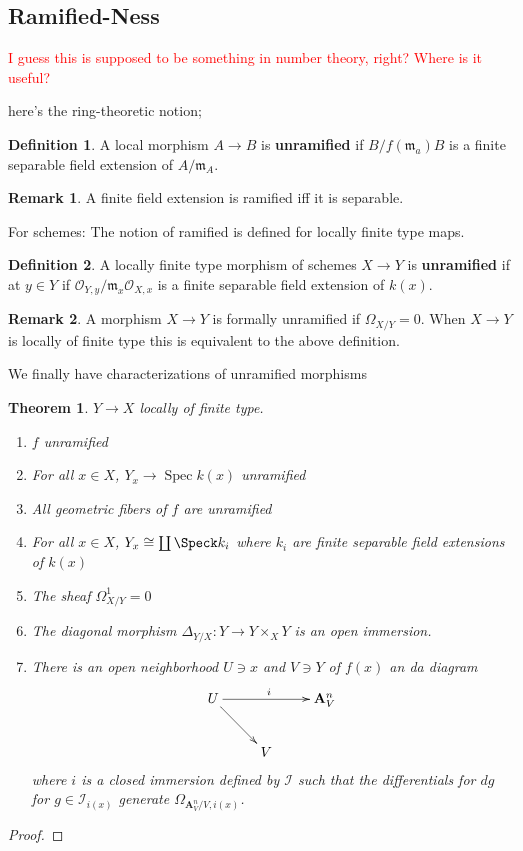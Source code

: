 \documentclass[english]{amsart}
\newcommand{\Spec}{\operatorname{Spec}}
\newcommand{\mf}{\mathfrak}
\newcommand{\mc}{\mathcal}
\newcommand{\mbf}{\mathbf}
\newcommand{\ques}[1]{\textcolor{red}{#1}}
\newtheorem*{thm}{Theorem}
\theoremstyle{definition}
\newtheorem*{defn}{Definition}
\newtheorem*{rmk}{Remark}
\begin{document}
\subsection{Ramified-Ness}

\ques{I guess this is supposed to be something in number theory, right? Where is it useful? }

here's the ring-theoretic notion;

\begin{defn}
A local morphism $A \to B$ is \textbf{unramified} if $B/f(\mf{m}_a) B$ is a finite separable field extension of $A/\mf{m}_A$. 
\end{defn}

\begin{rmk}
A finite field extension is ramified iff it is separable. 
\end{rmk}


For schemes: The notion of ramified is defined for locally finite type maps. 

\begin{defn}
A locally finite type morphism of schemes $X \to Y$ is \textbf{unramified} if at $y \in Y$ if $\mc{O}_{Y,y}/ \mf{m}_x \mc{O}_{X,x}$ is a finite separable field extension of $k(x)$. 
\end{defn}

\begin{rmk}
A morphism $X \to Y$ is formally unramified if $\Omega_{X/Y} = 0$. When $X \to Y$ is locally of finite type this is equivalent to the above definition. 
\end{rmk}

We finally have characterizations of unramified morphisms

\begin{thm}
$Y \to X$ locally of finite type. 
\begin{enumerate}
\item $f$ unramified
\item For all $x \in X$, $Y_x \to \Spec k(x)$ unramified
\item All geometric fibers of $f$ are unramified
\item For all $x \in X$, $Y_x \cong \coprod \Speck k_i$ where $k_i$ are finite separable field extensions of $k(x)$
\item The sheaf $\Omega^1_{X/Y} = 0$
\item The diagonal morphism $\Delta_{Y/X} : Y \to Y \times_X Y$ is an open immersion. 
\item There is an open neighborhood $U \ni x$ and $V \ni Y$ of $f(x)$ an da diagram
\[
\xymatrix{
U \ar[rr]^i \ar[dr] & & \mbf{A}^n_V\\
 & V & 
}
\]
where $i$ is a closed immersion defined by $\mc{I}$ such that the differentials for $dg$ for $g \in \mc{I}_{i(x)}$ generate $\Omega_{\mbf{A}^n_V/V,i(x)}$. 
\end{enumerate}
\end{thm}
\begin{proof}

\end{proof}
\end{document}
